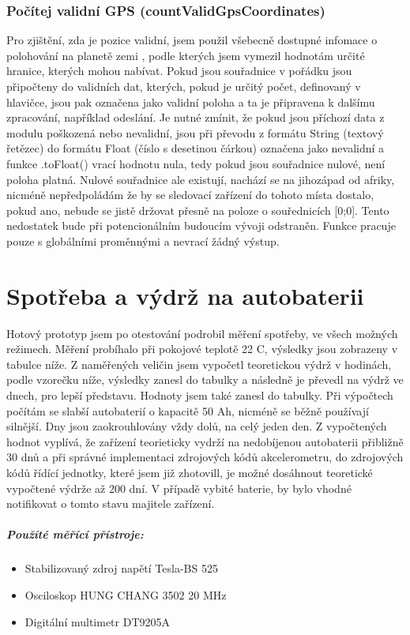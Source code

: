 \documentclass[FM,BP]{tulthesis}  %
\begin{document}
\subsection{Počítej validní GPS (countValidGpsCoordinates)}
Pro zjištění, zda je pozice validní, jsem použil všebecně dostupné infomace o polohování na planetě zemi \cite{geographic}, podle kterých jsem vymezil hodnotám určité hranice, kterých mohou nabívat. Pokud jsou souřadnice v pořádku jsou připočteny do validních dat, kterých, pokud je určitý počet, definovaný v hlavičce, jsou pak označena jako validní poloha a ta je připravena k dalšímu zpracování, například odeslání. Je nutné zmínit, že pokud jsou příchozí data z modulu poškozená nebo nevalidní, jsou při převodu z formátu String (textový řetězec) do formátu Float (číslo s desetinou čárkou) označena jako nevalidní a funkce .toFloat() vrací hodnotu nula, tedy pokud jsou souřadnice nulové, není poloha platná. Nulové souřadnice ale existují, nachází se na jihozápad od afriky, nicméně nepředpoládám že by se sledovací zařízení do tohoto místa dostalo, pokud ano, nebude se jistě držovat přesně na poloze o souřednicích [0;0]. Tento nedostatek bude při potencionálním budoucím vývoji odstraněn. Funkce pracuje pouze s globálními proměnnými a nevrací žádný výstup.


\chapter{Spotřeba a výdrž na autobaterii}
Hotový prototyp jsem po otestování podrobil měření spotřeby, ve všech možných režimech. Měření probíhalo při pokojové teplotě 22 \degree C, výsledky jsou zobrazeny v tabulce níže. Z naměřených veličin jsem vypočetl teoretickou výdrž v hodinách, podle vzorečku níže, výsledky zanesl do tabulky a následně je převedl na výdrž ve dnech, pro lepší představu. Hodnoty jsem také zanesl do tabulky. Při výpočtech počítám se slabší autobaterií o kapacitě 50 Ah, nicméně se běžně používají silnější. Dny jsou zaokrouhlovány vždy dolů, na celý jeden den. Z vypočtených hodnot vyplívá, že zařízení teorieticky vydrží na nedobíjenou autobaterii přibližně 30 dnů a při správné implementaci zdrojových kódů akcelerometru, do zdrojových kódů řídící jednotky, které jsem již zhotovill, je možné dosáhnout teoretické vypočtené výdrže až 200 dní. V případě vybité baterie, by bylo vhodné notifikovat o tomto stavu majitele zařízení.

\paragraph{Použíté měřící přístroje:}
\begin{itemize}
\item Stabilizovaný zdroj napětí Tesla-BS 525
\item Osciloskop HUNG CHANG 3502 20 MHz
\item Digitální multimetr DT9205A
\end{itemize}
\end{document}
